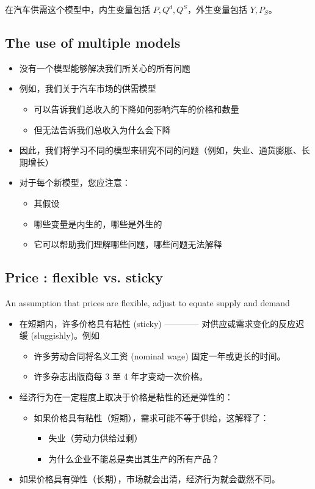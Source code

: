 \documentclass[lang=cn,10pt,green]{elegantbook}
\begin{document}
在汽车供需这个模型中，内生变量包括 $P, Q^d, Q^S$，外生变量包括 $Y, P_S$。

\subsection{The use of multiple models}

\begin{itemize}
    \item 没有一个模型能够解决我们所关心的所有问题
    \item 例如，我们关于汽车市场的供需模型
    \begin{itemize}
        \item 可以告诉我们总收入的下降如何影响汽车的价格和数量
        \item 但无法告诉我们总收入为什么会下降
    \end{itemize}
    \item 因此，我们将学习不同的模型来研究不同的问题（例如，失业、通货膨胀、长期增长）
    \item 对于每个新模型，您应注意：
    \begin{itemize}
        \item 其假设
        \item 哪些变量是内生的，哪些是外生的
        \item 它可以帮助我们理解哪些问题，哪些问题无法解释
    \end{itemize}
\end{itemize}

\subsection{Price : flexible vs. sticky}

\begin{definition}
    An assumption that prices are flexible, adjust to equate supply and demand
\end{definition}
\begin{itemize}
    \item 在短期内，许多价格具有粘性 (sticky) ———— 对供应或需求变化的反应迟缓 (sluggishly)。例如
    \begin{itemize}
        \item 许多劳动合同将名义工资 (nominal wage) 固定一年或更长的时间。
        \item 许多杂志出版商每 3 至 4 年才变动一次价格。
    \end{itemize}
    \item 经济行为在一定程度上取决于价格是粘性的还是弹性的： 
    \begin{itemize}
        \item 如果价格具有粘性（短期），需求可能不等于供给，这解释了：
        \begin{itemize}
            \item 失业（劳动力供给过剩）
            \item 为什么企业不能总是卖出其生产的所有产品？
        \end{itemize}
    \end{itemize}
    \item 如果价格具有弹性（长期），市场就会出清，经济行为就会截然不同。
\end{itemize}
\end{document}
